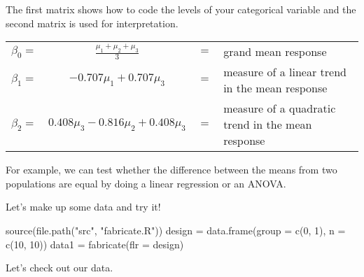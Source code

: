 \documentclass[
]{book}
\newenvironment{Shaded}{\begin{snugshade}}{\end{snugshade}}
\newcommand{\AttributeTok}[1]{\textcolor[rgb]{0.77,0.63,0.00}{#1}}
\newcommand{\DecValTok}[1]{\textcolor[rgb]{0.00,0.00,0.81}{#1}}
\newcommand{\FunctionTok}[1]{\textcolor[rgb]{0.00,0.00,0.00}{#1}}
\newcommand{\NormalTok}[1]{#1}
\newcommand{\OtherTok}[1]{\textcolor[rgb]{0.56,0.35,0.01}{#1}}
\newcommand{\StringTok}[1]{\textcolor[rgb]{0.31,0.60,0.02}{#1}}
\begin{document}
The first matrix shows how to code the levels of your categorical
variable and the second matrix is used for interpretation.

\begin{tabularx}{\textwidth}{r c c X}
\(\beta_0 =\) &\(\tfrac{\mu_1+\mu_2+\mu_3}{3}\) &\(=\) &grand mean response \\
\(\beta_1 =\) &\(-0.707\mu_1 + 0.707\mu_3\) &\(=\) &measure of a linear trend in the mean response \\
\(\beta_2 =\) &\(0.408 \mu_3 - 0.816 \mu_2 + 0.408 \mu_3\) &\(=\) &measure of a quadratic trend in the mean response
\end{tabularx}

For example, we can test whether the difference between the means from
two populations are equal by doing a linear regression or an ANOVA.

Let's make up some data and try it!

\begin{Shaded}
\begin{Highlighting}[]
\FunctionTok{source}\NormalTok{(}\FunctionTok{file.path}\NormalTok{(}\StringTok{"src"}\NormalTok{, }\StringTok{"fabricate.R"}\NormalTok{))}
\NormalTok{design }\OtherTok{=} \FunctionTok{data.frame}\NormalTok{(}\AttributeTok{group =} \FunctionTok{c}\NormalTok{(}\DecValTok{0}\NormalTok{, }\DecValTok{1}\NormalTok{), }\AttributeTok{n =} \FunctionTok{c}\NormalTok{(}\DecValTok{10}\NormalTok{, }\DecValTok{10}\NormalTok{))}
\NormalTok{data1 }\OtherTok{=} \FunctionTok{fabricate}\NormalTok{(}\AttributeTok{flr =}\NormalTok{ design)}
\end{Highlighting}
\end{Shaded}

Let's check out our data.
\end{document}
